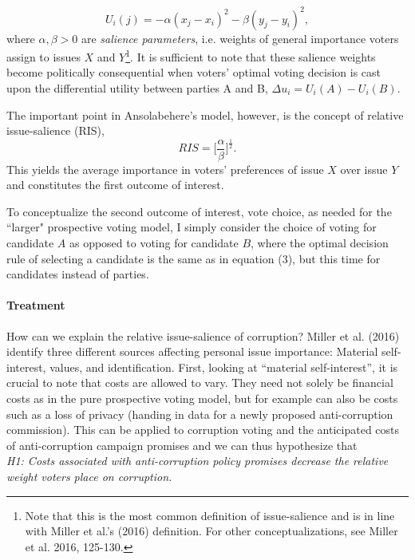 \documentclass[11pt]{article}
\begin{document}
\begin{equation}
U_i(j) = - \alpha(x_j - x_i)^2 - \beta(y_j - y_i)^2,
\end{equation}
where $\alpha, \beta > 0$ are \textit{salience parameters}, i.e. weights of general importance voters assign to issues $X$ and $Y$\footnote{Note that this is the most common definition of issue-salience and is in line with Miller et al.'s (2016) definition. For other conceptualizations, see Miller et al. 2016, 125-130.}. It is sufficient to note that these salience weights become politically consequential when voters' optimal voting decision is cast upon the differential utility between parties A and B, $\Delta u_i = U_i(A) - U_i(B)$.

The important point in Ansolabehere's model, however, is the concept of relative issue-salience (RIS),
\begin{equation}
RIS = \bigg[\frac{\alpha}{\beta}\bigg]^\frac{1}{2}.
\end{equation} 
This yields the average importance in voters' preferences of issue $X$ over issue $Y$ and constitutes the first outcome of interest.

To conceptualize the second outcome of interest, vote choice, as needed for the “larger" prospective voting model, I simply consider the choice of voting for candidate $A$ as opposed to voting for candidate $B$, where the optimal decision rule of selecting a candidate is the same as in equation (3), but this time for candidates instead of parties.

\paragraph{Treatment}
How can we explain the relative issue-salience of corruption? Miller et al. (2016) identify three different sources affecting personal issue importance: Material self-interest, values, and identification. First, looking at ``material self-interest'', it is crucial to note that costs are allowed to vary. They need not solely be financial costs as in the pure prospective voting model, but for example can also be costs such as a loss of privacy (handing in data for a newly proposed anti-corruption commission). This can be applied to corruption voting and the anticipated costs of anti-corruption campaign promises and we can thus hypothesize that \\
\textit{H1: Costs associated with anti-corruption policy promises decrease the relative weight voters place on corruption.}
\end{document}
